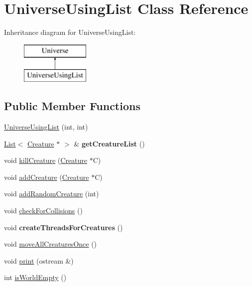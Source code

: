 \hypertarget{class_universe_using_list}{}\section{Universe\+Using\+List Class Reference}
\label{class_universe_using_list}
Inheritance diagram for Universe\+Using\+List\+:\begin{figure}[H]
\begin{center}
\leavevmode
\includegraphics[height=2.000000cm]{class_universe_using_list}
\end{center}
\end{figure}
\subsection*{Public Member Functions}
\begin{DoxyCompactItemize}
\item 
\hyperlink{class_universe_using_list_a690190032d86eadad922b33166d6d11a}{Universe\+Using\+List} (int, int)
\item 
\hyperlink{class_list}{List}$<$ \hyperlink{class_creature}{Creature} $\ast$ $>$ \& {\bfseries get\+Creature\+List} ()\hypertarget{class_universe_using_list_a36f07f521195e099c92408ce25ac9928}{}\label{class_universe_using_list_a36f07f521195e099c92408ce25ac9928}

\item 
void \hyperlink{class_universe_using_list_ad5ae1ddeb1ea11111e506373de5364d8}{kill\+Creature} (\hyperlink{class_creature}{Creature} $\ast$C)
\item 
void \hyperlink{class_universe_using_list_a936d1a839b5cd80f9715c7f2e2daf1da}{add\+Creature} (\hyperlink{class_creature}{Creature} $\ast$C)
\item 
void \hyperlink{class_universe_using_list_ae7ed5dcf3d2c24f82fd677f6df814818}{add\+Random\+Creature} (int)
\item 
void \hyperlink{class_universe_using_list_aa42ce1540f469e72a4a05cce7d9f2baf}{check\+For\+Collisions} ()
\item 
void {\bfseries create\+Threads\+For\+Creatures} ()\hypertarget{class_universe_using_list_a91a69b21d08144a53635272095029cc4}{}\label{class_universe_using_list_a91a69b21d08144a53635272095029cc4}

\item 
void \hyperlink{class_universe_using_list_ab02c14d60f147146649289d09b732b5d}{move\+All\+Creatures\+Once} ()
\item 
void \hyperlink{class_universe_using_list_a9cbe5a6b7497005e60131907a3aa8120}{print} (ostream \&)
\item 
int \hyperlink{class_universe_using_list_ab60b016b417ad376180ff95fb4ac7531}{is\+World\+Empty} ()
\end{DoxyCompactItemize}



